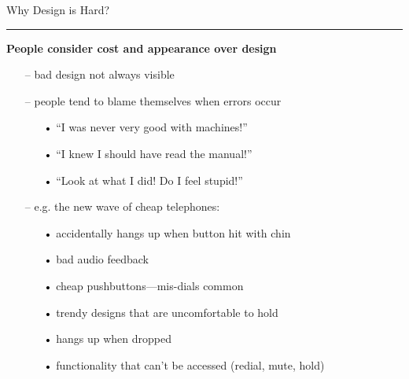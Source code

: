 \documentclass[pdf]{beamer}
\begin{document}
\begin{frame}
	{Why Design is Hard?}{\textcolor{red}{\rule{12cm}{1.2pt}}}
	
\large{\textbf{People consider cost and appearance over design}}
    
    \begin{itemize}
    	\item[--] bad design not always visible
    \end{itemize}
    \bigskip
   \begin{itemize}
        \item[--]people tend to blame themselves when errors occur
        \begin{itemize}
        	\item[\textcolor{black}{•}] “I was never very good with machines!”
            \item[\textcolor{black}{•}] “I knew I should have read the manual!”
            \item[\textcolor{black}{•}] “Look at what I did! Do I feel stupid!”
        \end{itemize}
    \end{itemize}
    \bigskip
    \begin{itemize}
    \item[--] e.g. the new wave of cheap telephones:
     \begin{itemize}
        	\item[\textcolor{black}{•}] accidentally hangs up when button hit with chin
            \item[\textcolor{black}{•}] bad audio feedback
            \item[\textcolor{black}{•}] cheap pushbuttons—mis-dials common
			\item[\textcolor{black}{•}]trendy designs that are uncomfortable to hold
			\item[\textcolor{black}{•}]hangs up when dropped
			\item[\textcolor{black}{•}]functionality that can’t be accessed (redial, mute, hold)
        \end{itemize}
    \end{itemize}
    
\end{frame}
\end{document}
